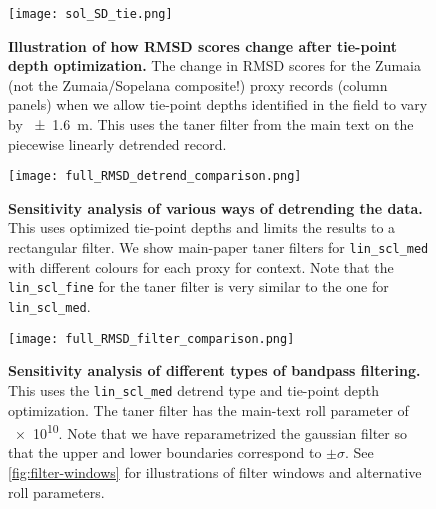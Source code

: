 \documentclass[draft]{agujournal2019}
\begin{document}
\begin{figure}[htb]
  \centering \texttt{[image: sol\_SD\_tie.png]}
  \caption{\label{fig:full-RMSD-tie}
    \textbf{Illustration of how RMSD scores change after tie-point depth optimization.}
    The change in \gls{RMSD} scores for the
    Zumaia (not the Zumaia/Sopelana composite!) proxy records (column panels)
    when we allow tie-point depths identified in the field to vary by \qty{\pm1.6}{\metre}.
    This uses the taner filter from the main text on the piecewise linearly detrended record.
    }
\end{figure}

\begin{figure}[htb]
  \centering \texttt{[image: full\_RMSD\_detrend\_comparison.png]}
  \caption{\label{fig:full-RMSD-detrend}
    \textbf{Sensitivity analysis of various ways of detrending the data.}
    This uses optimized tie-point depths and limits the results to a rectangular filter.
    We show main-paper taner filters for \texttt{lin\_scl\_med} with different colours for each proxy for context.
    Note that the \texttt{lin\_scl\_fine} for the taner filter is very similar to the one for \texttt{lin\_scl\_med}.
    }
\end{figure}

\begin{figure}[htb]
  \centering \texttt{[image: full\_RMSD\_filter\_comparison.png]}
  \caption{\label{fig:full-RMSD-filter}
    \textbf{Sensitivity analysis of different types of bandpass filtering.}
    This uses the \texttt{lin\_scl\_med} detrend type and tie-point depth optimization.
    The taner filter has the main-text roll parameter of \num{e10}.
    Note that we have reparametrized the gaussian filter so that the upper and lower boundaries correspond to \(\pm\sigma\).
    See \cref{fig:filter-windows} for illustrations of filter windows and alternative roll parameters.
    }
\end{figure}
\end{document}

